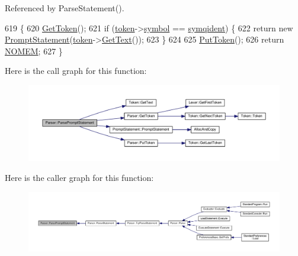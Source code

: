 Referenced by Parse\+Statement().


\begin{DoxyCode}
619 \{
620     \hyperlink{classParser_a415a103e66558b4d366d9a1420561fe3}{GetToken}();
621     \textcolor{keywordflow}{if} (\hyperlink{classParser_a467028559d31c5b33f16ca8be56715cc}{token}->\hyperlink{structToken_aa671eaaae5632c5277e89a090d864820}{symbol} == \hyperlink{lex_8h_a7feef761cd73fac6e25b8bb80d2c4e54a9a4f2a8a367485e87d9faf675bec17af}{symqident}) \{
622         \textcolor{keywordflow}{return} \textcolor{keyword}{new} \hyperlink{classPromptStatement}{PromptStatement}(\hyperlink{classParser_a467028559d31c5b33f16ca8be56715cc}{token}->\hyperlink{structToken_a15f1043de07ce8e452fbf115b85def71}{GetText}());
623     \}
624 
625     \hyperlink{classParser_adb5c3a188b36f7ecb198ae30f06338b3}{PutToken}();
626     \textcolor{keywordflow}{return} \hyperlink{platform_8h_a46ff2bfbf0d44b8466a2251d5bd5e6f8}{NOMEM};
627 \}
\end{DoxyCode}


Here is the call graph for this function\+:\nopagebreak
\begin{figure}[H]
\begin{center}
\leavevmode
\includegraphics[width=350pt]{classParser_a3ff34c9305bf6b5f10aacf27e5d20c28_cgraph}
\end{center}
\end{figure}




Here is the caller graph for this function\+:\nopagebreak
\begin{figure}[H]
\begin{center}
\leavevmode
\includegraphics[width=350pt]{classParser_a3ff34c9305bf6b5f10aacf27e5d20c28_icgraph}
\end{center}
\end{figure}


